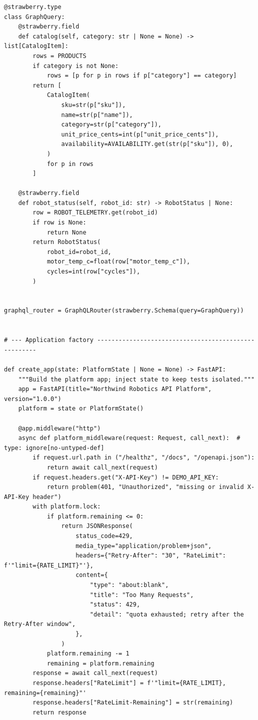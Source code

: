 \begin{verbatim}
@strawberry.type
class GraphQuery:
    @strawberry.field
    def catalog(self, category: str | None = None) -> list[CatalogItem]:
        rows = PRODUCTS
        if category is not None:
            rows = [p for p in rows if p["category"] == category]
        return [
            CatalogItem(
                sku=str(p["sku"]),
                name=str(p["name"]),
                category=str(p["category"]),
                unit_price_cents=int(p["unit_price_cents"]),
                availability=AVAILABILITY.get(str(p["sku"]), 0),
            )
            for p in rows
        ]

    @strawberry.field
    def robot_status(self, robot_id: str) -> RobotStatus | None:
        row = ROBOT_TELEMETRY.get(robot_id)
        if row is None:
            return None
        return RobotStatus(
            robot_id=robot_id,
            motor_temp_c=float(row["motor_temp_c"]),
            cycles=int(row["cycles"]),
        )


graphql_router = GraphQLRouter(strawberry.Schema(query=GraphQuery))


# --- Application factory -----------------------------------------------------

def create_app(state: PlatformState | None = None) -> FastAPI:
    """Build the platform app; inject state to keep tests isolated."""
    app = FastAPI(title="Northwind Robotics API Platform", version="1.0.0")
    platform = state or PlatformState()

    @app.middleware("http")
    async def platform_middleware(request: Request, call_next):  # type: ignore[no-untyped-def]
        if request.url.path in ("/healthz", "/docs", "/openapi.json"):
            return await call_next(request)
        if request.headers.get("X-API-Key") != DEMO_API_KEY:
            return problem(401, "Unauthorized", "missing or invalid X-API-Key header")
        with platform.lock:
            if platform.remaining <= 0:
                return JSONResponse(
                    status_code=429,
                    media_type="application/problem+json",
                    headers={"Retry-After": "30", "RateLimit": f'"limit={RATE_LIMIT}"'},
                    content={
                        "type": "about:blank",
                        "title": "Too Many Requests",
                        "status": 429,
                        "detail": "quota exhausted; retry after the Retry-After window",
                    },
                )
            platform.remaining -= 1
            remaining = platform.remaining
        response = await call_next(request)
        response.headers["RateLimit"] = f'"limit={RATE_LIMIT}, remaining={remaining}"'
        response.headers["RateLimit-Remaining"] = str(remaining)
        return response


\end{verbatim}
